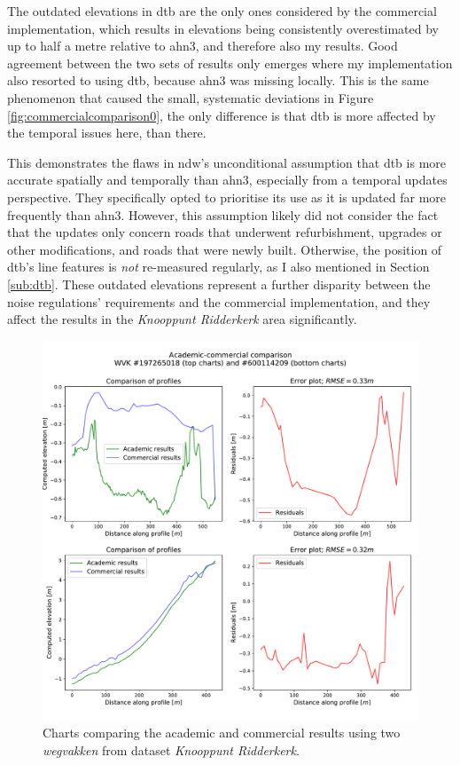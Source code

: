 The outdated elevations in \ac{dtb} are the only ones considered by the commercial implementation, which results in elevations being consistently overestimated by up to half a metre relative to \ac{ahn3}, and therefore also my results. Good agreement between the two sets of results only emerges where my implementation also resorted to using \ac{dtb}, because \ac{ahn3} was missing locally. This is the same phenomenon that caused the small, systematic deviations in Figure \ref{fig:commercialcomparison0}, the only difference is that \ac{dtb} is more affected by the temporal issues here, than there.

This demonstrates the flaws in \ac{ndw}'s unconditional assumption that \ac{dtb} is more accurate spatially and temporally than \ac{ahn3}, especially from a temporal updates perspective. They specifically opted to prioritise its use as it is updated far more frequently than \ac{ahn3}. However, this assumption likely did not consider the fact that the updates only concern roads that underwent refurbishment, upgrades or other modifications, and roads that were newly built. Otherwise, the position of \ac{dtb}'s line features is \textit{not} re-measured regularly, as I also mentioned in Section \ref{sub:dtb}. These outdated elevations represent a further disparity between the noise regulations' requirements and the commercial implementation, and they affect the results in the \textit{Knooppunt Ridderkerk} area significantly.

\begin{figure}
    \centering
    \includegraphics[width=0.87\linewidth]{final_report/figs/commercialcomparison2.pdf}
    \caption{Charts comparing the academic and commercial results using two \textit{wegvakken} from dataset \textit{Knooppunt Ridderkerk}.}
    \label{fig:commercialcomparison2}
\end{figure}

